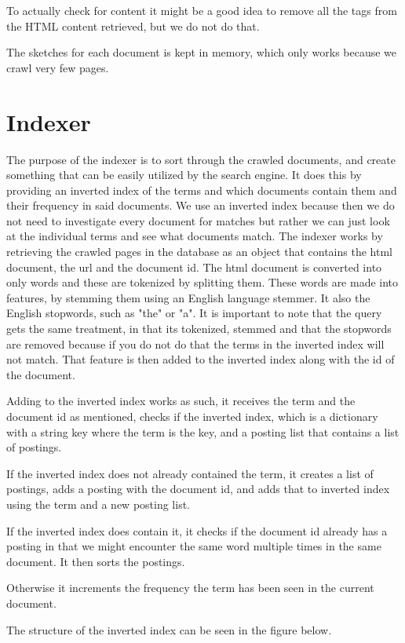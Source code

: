 	To actually check for content it might be a good idea to remove all the tags from the HTML content retrieved, but we do not do that.
	
	The sketches for each document is kept in memory, which only works because we crawl very few pages.
	
	\section{Indexer}
	The purpose of the indexer is to sort through the crawled documents, and create something that can be easily utilized by the search engine. It does this by providing an inverted index of the terms and which documents contain them and their frequency in said documents.
	We use an inverted index because then we do not need to investigate every document for matches but rather we can just look at the individual terms and see what documents match.
	The indexer works by retrieving the crawled pages in the database as an object that contains the html document, the url and the document id.
	The html document is converted into only words and these are tokenized by splitting them. 
	These words are made into features, by stemming them using an English language stemmer. It also the English stopwords, such as "the" or "a".
	It is important to note that the query gets the same treatment, in that its tokenized, stemmed and that the stopwords are removed because if you do not do that the terms in the inverted index will not match.
	That feature is then added to the inverted index along with the id of the document.
	
	Adding to the inverted index works as such, it receives the term and the document id as mentioned, checks if the inverted index, which is a dictionary with a string key where the term is the key, and a posting list that contains a list of postings.
	
	If the inverted index does not already contained the term, it creates a list of postings, adds a posting with the document id, and adds that to inverted index using the term and a new posting list.
	
	If the inverted index does contain it, it checks if the document id already has a posting in that we might encounter the same word multiple times in the same document. It then sorts the postings.
	
	Otherwise it increments the frequency the term has been seen in the current document.
	
	The structure of the inverted index can be seen in the figure below.
	

